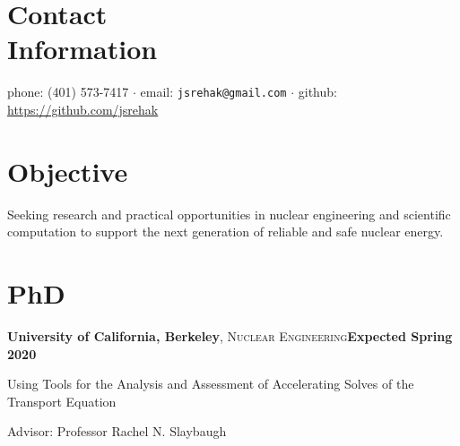 \documentclass[margin,line]{resume}
\begin{document}
\begin{resume}
  \section{\mysidestyle Contact\\Information}
  phone: (401) 573-7417 $\cdot$ email: \verb`jsrehak@gmail.com`
  $\cdot$ github: \url{https://github.com/jsrehak}\hfill \\

    \section{\mysidestyle Objective}
                Seeking research and practical opportunities in
                nuclear engineering and scientific computation to
                support the next generation of reliable and safe
                nuclear energy.%
    \section{\mysidestyle PhD}
    \textbf{University of California, Berkeley}, \textsc{Nuclear
      Engineering}\hfill \textbf{Expected Spring 2020}\vspace{-3mm}\\\vspace{-1mm}%
    \begin{list2}
        \item[] Using Tools for the Analysis and Assessment of Accelerating Solves of the Transport Equation
        \item[] Advisor:  Professor Rachel N. Slaybaugh
    \end{list2}\vspace{-1.5mm}

\end{resume}
\end{document}
